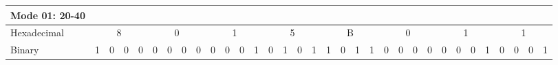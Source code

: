 \begin{table}[!htb]
{\begin{tabular}{lcccccccccccccccccccccccccccccccc}
\cellcolor[HTML]{9B9B9B}Mode 01: 20-40 & \multicolumn{1}{l}{} & \multicolumn{1}{l}{} & \multicolumn{1}{l}{} & \multicolumn{1}{l}{} & \multicolumn{1}{l}{} & \multicolumn{1}{l}{} & \multicolumn{1}{l}{} & \multicolumn{1}{l}{} & \multicolumn{1}{l}{} & \multicolumn{1}{l}{} & \multicolumn{1}{l}{} & \multicolumn{1}{l}{} & \multicolumn{1}{l}{} & \multicolumn{1}{l}{\cellcolor[HTML]{FFFFFF}} & \multicolumn{1}{l}{} & \multicolumn{1}{l}{} & \multicolumn{1}{l}{} & \multicolumn{1}{l}{} & \multicolumn{1}{l}{} & \multicolumn{1}{l}{} & \multicolumn{1}{l}{} & \multicolumn{1}{l}{} & \multicolumn{1}{l}{} & \multicolumn{1}{l}{} & \multicolumn{1}{l}{} & \multicolumn{1}{l}{} & \multicolumn{1}{l}{} & \multicolumn{1}{l}{} & \multicolumn{1}{l}{} & \multicolumn{1}{l}{} & \multicolumn{1}{l}{} & \multicolumn{1}{l}{} \\ \hline
\multicolumn{1}{|l|}{Hexadecimal} & \multicolumn{4}{c|}{8} & \multicolumn{4}{c|}{0} & \multicolumn{4}{c|}{1} & \multicolumn{4}{c|}{5} & \multicolumn{4}{c|}{B} & \multicolumn{4}{c|}{0} & \multicolumn{4}{c|}{1} & \multicolumn{4}{c|}{1} \\ \hline
\multicolumn{1}{|l|}{Binary} & \multicolumn{1}{c|}{1} & \multicolumn{1}{c|}{0} & \multicolumn{1}{c|}{0} & \multicolumn{1}{c|}{0} & \multicolumn{1}{c|}{0} & \multicolumn{1}{c|}{0} & \multicolumn{1}{c|}{0} & \multicolumn{1}{c|}{0} & \multicolumn{1}{c|}{0} & \multicolumn{1}{c|}{0} & \multicolumn{1}{c|}{0} & \multicolumn{1}{c|}{1} & \multicolumn{1}{c|}{0} & \multicolumn{1}{c|}{1} & \multicolumn{1}{c|}{0} & \multicolumn{1}{c|}{1} & \multicolumn{1}{c|}{1} & \multicolumn{1}{c|}{0} & \multicolumn{1}{c|}{1} & \multicolumn{1}{c|}{1} & \multicolumn{1}{c|}{0} & \multicolumn{1}{c|}{0} & \multicolumn{1}{c|}{0} & \multicolumn{1}{c|}{0} & \multicolumn{1}{c|}{0} & \multicolumn{1}{c|}{0} & \multicolumn{1}{c|}{0} & \multicolumn{1}{c|}{1} & \multicolumn{1}{c|}{0} & \multicolumn{1}{c|}{0} & \multicolumn{1}{c|}{0} & \multicolumn{1}{c|}{1} \\ \hline

\end{tabular}}
\end{table}
